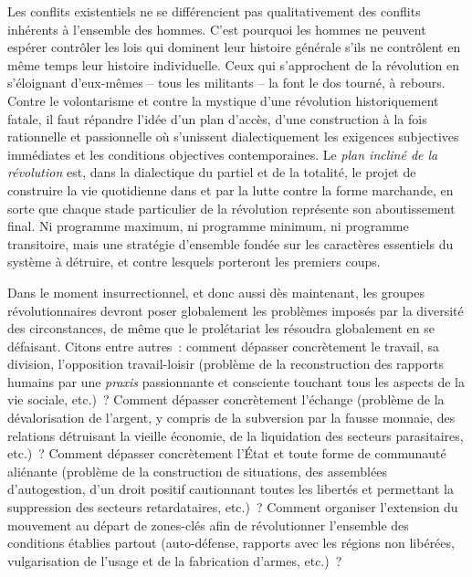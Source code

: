 \documentclass[french,twoside]{book} %
\begin{document}
Les conflits existentiels ne se différencient pas qualitativement des conflits inhérents à l’ensemble des hommes. C’est pourquoi les hommes ne peuvent espérer contrôler les lois qui dominent leur histoire générale s’ils ne contrôlent en même temps leur histoire individuelle. Ceux qui s’approchent de la révolution en s’éloignant d’eux-mêmes – tous les militants – la font le dos tourné, à rebours. Contre le volontarisme et contre la mystique d’une révolution historiquement fatale, il faut répandre l’idée d’un plan d’accès, d’une construction à la fois rationnelle et passionnelle où s’unissent dialectiquement les exigences subjectives immédiates et les conditions objectives contemporaines. Le \emph{plan incliné de la révolution} est, dans la dialectique du partiel et de la totalité, le projet de construire la vie quotidienne dans et par la lutte contre la forme marchande, en sorte que chaque stade particulier de la révolution représente son aboutissement final. Ni programme maximum, ni programme minimum, ni programme transitoire, mais une stratégie d’ensemble fondée sur les caractères essentiels du système à détruire, et contre lesquels porteront les premiers coups.\par
Dans le moment insurrectionnel, et donc aussi dès maintenant, les groupes révolutionnaires devront poser globalement les problèmes imposés par la diversité des circonstances, de même que le prolétariat les résoudra globalement en se défaisant. Citons entre autres : comment dépasser concrètement le travail, sa division, l’opposition travail-loisir (problème de la reconstruction des rapports humains par une \emph{praxis} passionnante et consciente touchant tous les aspects de la vie sociale, etc.) ? Comment dépasser concrètement l’échange (problème de la dévalorisation de l’argent, y compris de la subversion par la fausse monnaie, des relations détruisant la vieille économie, de la liquidation des secteurs parasitaires, etc.) ? Comment dépasser concrètement l’État et toute forme de communauté aliénante (problème de la construction de situations, des assemblées d’autogestion, d’un droit positif cautionnant toutes les libertés et permettant la suppression des secteurs retardataires, etc.) ? Comment organiser l’extension du mouvement au départ de zones-clés afin de révolutionner l’ensemble des conditions établies partout (auto-défense, rapports avec les régions non libérées, vulgarisation de l’usage et de la fabrication d’armes, etc.) ?\par
\end{document}
